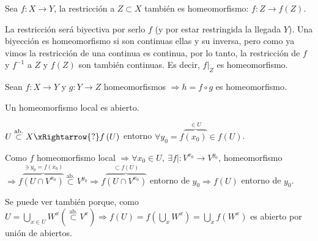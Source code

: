 \begin{prop}
Sea $f: X \rightarrow Y$, la restricción a $Z \subset X$ también es homeomorfismo: $f: Z \rightarrow f\left( Z \right)$.
\end{prop}
\begin{demo}
La restricción será biyectiva por serlo $f$ (y por estar restringida la llegada $Y$). Una biyección es homeomorfismo si son continuas ellas y su inversa, pero como ya vimos la restricción de una continua es continua, por lo tanto, la restricción de $f$ y $f^{-1}$ a $Z$ y $f\left( Z \right)$ son también continuas. Es decir, $f|_Z$ es homeomorfismo.
\end{demo}

\begin{prop}
Sean $f: X \rightarrow Y$ y $g: Y \rightarrow Z$ homeomorfismos $\Rightarrow h = f \circ g$ es homeomorfismo.
\end{prop}

\begin{prop}
Un homeomorfismo local es abierto.
\end{prop}
\begin{demo}
    $U \stackrel{\text{ab.}}{\subset} X \xRightarrow{?} f\left( U \right)$ entorno $\forall y_0 = f\overbrace{\left( x_0 \right)}^{\in U} \in f\left( U \right)$.

    Como $f$ homeomorfismo local $\Rightarrow \forall x_0 \in U,\ \exists f| : V^{x_0} \rightarrow V^{y_0}$, homeomorfismo $\Rightarrow f\overbrace{\left( U \cap V^{x_0} \right)}^{\ni y_0 = f\left( x_0 \right)} \stackrel{\text{ab.}}{\subset} V^{y_0} \Rightarrow f\overbrace{\left( U \cap V^{x_0} \right)}^{\subset f\left( U \right)}$ entorno de $y_0 \Rightarrow f\left( U \right)$ entorno de $y_0$.

    Se puede ver también porque, como $U = \bigcup_{x \in U} W^x (\stackrel{\text{ab.}}{\subset} V^{x}) \Rightarrow f\left( U \right) = f\left( \bigcup_{x} W^{x} \right) = \bigcup_{x} f\left( W^x \right)$ es abierto por unión de abiertos.
\end{demo}

